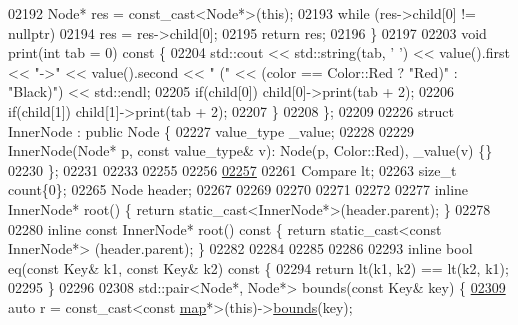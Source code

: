 \begin{DoxyCode}
02192             Node* res = \textcolor{keyword}{const\_cast<}Node*\textcolor{keyword}{>}(\textcolor{keyword}{this});
02193             \textcolor{keywordflow}{while} (res->child[0] != \textcolor{keyword}{nullptr})
02194                 res = res->child[0];
02195             \textcolor{keywordflow}{return} res;
02196         \}
02197 
02203         \textcolor{keywordtype}{void} print(\textcolor{keywordtype}{int} tab = 0)\textcolor{keyword}{ const }\{
02204             std::cout << std::string(tab, \textcolor{charliteral}{' '}) << value().first << \textcolor{stringliteral}{"->"} << 
      value().second << \textcolor{stringliteral}{"   ("} << (color == Color::Red ? \textcolor{stringliteral}{"Red)"} : \textcolor{stringliteral}{"Black)"}) << std::endl;
02205             \textcolor{keywordflow}{if}(child[0]) child[0]->print(tab + 2);
02206             \textcolor{keywordflow}{if}(child[1]) child[1]->print(tab + 2);
02207         \}
02208     \};
02209 
02226     \textcolor{keyword}{struct }InnerNode : \textcolor{keyword}{public} Node \{
02227         value\_type \_value;
02228 
02229         InnerNode(Node* p, \textcolor{keyword}{const} value\_type& v): Node(p, Color::Red), \_value(v)
       \{\}
02230     \};
02231 
02233 
02255 
02256 
\hypertarget{map_8h_source_l02257}{}\hyperlink{classaed2_1_1map_a0e5be36fae0693e4665bd2a615e7550a_a0e5be36fae0693e4665bd2a615e7550a}{02257} 
02261     Compare lt;
02263     \textcolor{keywordtype}{size\_t} count\{0\};
02265     Node header;
02267 
02269 
02270 
02271 
02272 
02277     \textcolor{keyword}{inline} InnerNode* root() \{ \textcolor{keywordflow}{return} \textcolor{keyword}{static\_cast<}InnerNode*\textcolor{keyword}{>}(header.parent); \}
02278 
02280     \textcolor{keyword}{inline} \textcolor{keyword}{const} InnerNode* root()\textcolor{keyword}{ const }\{ \textcolor{keywordflow}{return} \textcolor{keyword}{static\_cast<}\textcolor{keyword}{const }InnerNode*\textcolor{keyword}{>}
      (header.parent); \}
02282 
02284 
02285 
02286 
02293     \textcolor{keyword}{inline} \textcolor{keywordtype}{bool} eq(\textcolor{keyword}{const} Key& k1, \textcolor{keyword}{const} Key& k2)\textcolor{keyword}{ const }\{
02294         \textcolor{keywordflow}{return} lt(k1, k2) == lt(k2, k1);
02295     \}
02296 
02308     std::pair<Node*, Node*> bounds(\textcolor{keyword}{const} Key& key) \{
\hypertarget{map_8h_source_l02309}{}\hyperlink{classaed2_1_1map_a4d903414b3f1f1e6f785342bb3900572_a4d903414b3f1f1e6f785342bb3900572}{02309}         \textcolor{keyword}{auto} r = \textcolor{keyword}{const\_cast<}\textcolor{keyword}{const }\hyperlink{classaed2_1_1map}{map}*\textcolor{keyword}{>}(\textcolor{keyword}{this})->\hyperlink{classaed2_1_1map_a4d903414b3f1f1e6f785342bb3900572_a4d903414b3f1f1e6f785342bb3900572}{bounds}(key);

\end{DoxyCode}
